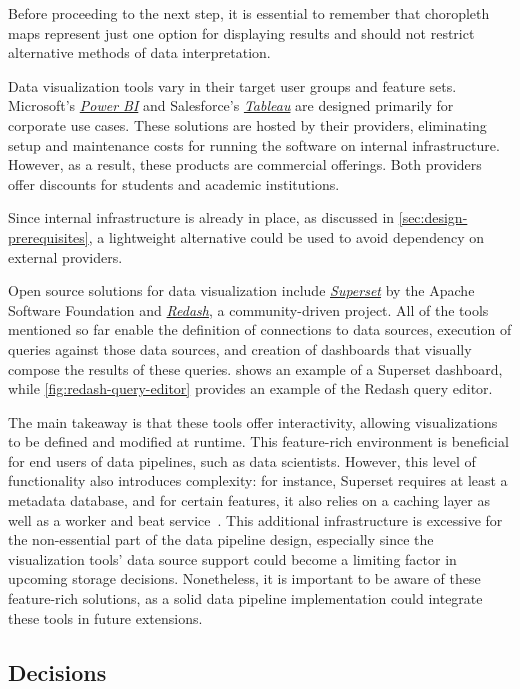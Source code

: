 Before proceeding to the next step, it is essential to remember that choropleth maps represent just one option for displaying results and should not restrict alternative methods of data interpretation.

Data visualization tools vary in their target user groups and feature sets.
Microsoft's \href{https://microsoft.com/power-platform/products/power-bi}{\textit{Power BI}} and Salesforce's \href{https://tableau.com/}{\textit{Tableau}} are designed primarily for corporate use cases.
These solutions are hosted by their providers, eliminating setup and maintenance costs for running the software on internal infrastructure.
However, as a result, these products are commercial offerings.
Both providers offer discounts for students and academic institutions.

Since internal infrastructure is already in place, as discussed in \cref{sec:design-prerequisites}, a lightweight alternative could be used to avoid dependency on external providers.

Open source solutions for data visualization include \href{https://superset.apache.org/}{\textit{Superset}} by the Apache Software Foundation and \href{https://redash.io/}{\textit{Redash}}, a community-driven project.
All of the tools mentioned so far enable the definition of connections to data sources, execution of queries against those data sources, and creation of dashboards that visually compose the results of these queries.
 shows an example of a Superset dashboard, while \cref{fig:redash-query-editor} provides an example of the Redash query editor.

The main takeaway is that these tools offer interactivity, allowing visualizations to be defined and modified at runtime.
This feature-rich environment is beneficial for end users of data pipelines, such as data scientists.
However, this level of functionality also introduces complexity: for instance, Superset requires at least a metadata database, and for certain features, it also relies on a caching layer as well as a worker and beat service~\cite{ASF2024}.
This additional infrastructure is excessive for the non-essential part of the data pipeline design, especially since the visualization tools' data source support could become a limiting factor in upcoming storage decisions.
Nonetheless, it is important to be aware of these feature-rich solutions, as a solid data pipeline implementation could integrate these tools in future extensions.


\subsection{Decisions}
\label{sec:design-decisions}

